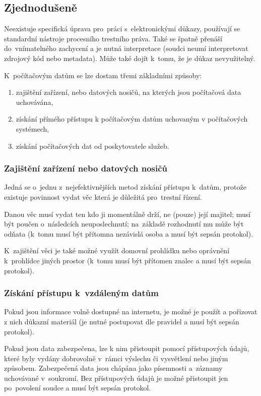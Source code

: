 \subsection{Zjednodušeně}

Neexistuje specifická úprava pro~práci s~elektronickými důkazy, používají se standardní nástroje procesního trestního práva.
Také se špatně přenáší do~vnímatelného zachycení a je nutná interpretace (soudci neumí interpretovat zdrojový kód nebo metadata).
Může také dojít k~tomu, že je důkaz nevyužitelný.

K~počítačovým datům se lze dostam třemi základními způsoby:
\begin{enumerate}[label=\alph*)]
    \item zajištění zařízení, nebo datových nosičů, na kterých jsou počítačová data uchovávána,
    \item získání přímého přístupu k počítačovým datům uchovaným v počítačových systémech,
    \item získání počítačových dat od poskytovatele služeb.
\end{enumerate}

\subsubsection{Zajištění zařízení nebo datových nosičů}

Jedná se o~jednu z~nejefektivnějších metod získání přístupu k~datům, protože existuje povinnost vydat věc která je důležitá pro~trestní řízení.

Danou věc musí vydat ten kdo ji momentálně drží, ne (pouze) její majitel; musí být poučen o~následcích neuposlechnutí; na~základě rozhodnutí mu může být odňata (k~tomu musí být přítomna nezávislá osoba a musí být sepsán protokol).

K~zajištění věci je také možné využít domovní prohlídku nebo oprávnění k~prohlídce jiných prostor (k~tomu musí být přítomen znalec a musí být sepsán protokol).


\subsubsection{Získání přístupu k~vzdáleným datům}

Pokud jsou informace volně dostupné na internetu, je možné je použít a pořizovat z nich důkazní materiál (je nutné postupovat dle pravidel a musí být sepsán protokol).

Pokud jsou data zabezpečena, lze k nim přistoupit pomocí přístupových údajů, které byly vydány dobrovolně v~rámci výslechu či vysvětlení nebo jiným způsobem.
Zabezpečená data jsou chápána jako písemnosti a~záznamy uchovávané v~soukromí.
Bez přístupových údajů je možné přistoupit jen po~povolení soudce a musí být sepsán protokol.

